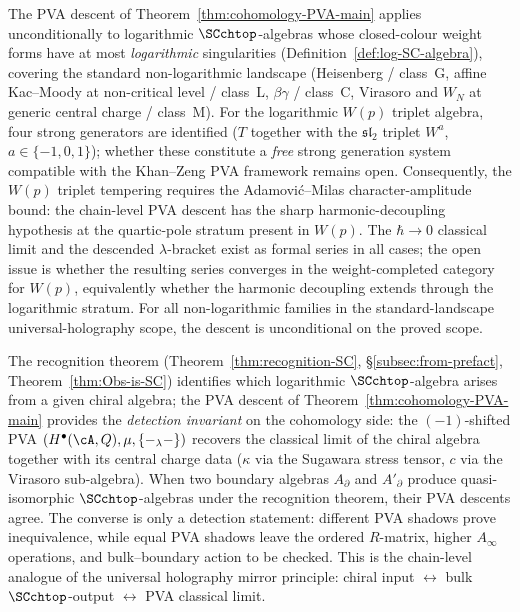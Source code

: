 \begin{remark}
\label{rem:pva-wp-tempering-scope}
The PVA descent of Theorem~\ref{thm:cohomology-PVA-main} applies
unconditionally to logarithmic $\SCchtop$-algebras whose closed-colour
weight forms have at most \emph{logarithmic} singularities
(Definition~\ref{def:log-SC-algebra}), covering the standard
non-logarithmic landscape (Heisenberg / class~G, affine Kac--Moody at
non-critical level / class~L, $\beta\gamma$ / class~C, Virasoro and
$W_N$ at generic central charge / class~M). For the logarithmic
$W(p)$ triplet algebra, four strong generators are identified ($T$
together with the $\mathfrak{sl}_2$ triplet $W^a$,
$a \in \{-1, 0, 1\}$); whether these constitute a \emph{free} strong
generation system compatible with the Khan--Zeng PVA framework
\cite{KZ25} remains open. Consequently, the $W(p)$ triplet tempering
requires the Adamovi\'c--Milas character-amplitude bound: the
chain-level PVA descent has the sharp harmonic-decoupling hypothesis
at the quartic-pole stratum present in $W(p)$. The $\hbar \to 0$
classical limit and the
descended $\lambda$-bracket exist as formal series in all cases; the
open issue is whether the resulting series converges in the
weight-completed category for $W(p)$, equivalently whether the
harmonic decoupling extends through the logarithmic stratum. For all
non-logarithmic families in the standard-landscape universal-holography
scope, the descent is unconditional on the proved scope.
\end{remark}

\begin{remark}
\label{rem:pva-recognition-detection}
The recognition theorem (Theorem~\ref{thm:recognition-SC}, \S\ref{subsec:from-prefact},
Theorem~\ref{thm:Obs-is-SC}) identifies which logarithmic $\SCchtop$-algebra
arises from a given chiral algebra; the PVA descent of
Theorem~\ref{thm:cohomology-PVA-main} provides the \emph{detection invariant}
on the cohomology side: the $(-1)$-shifted PVA $(H^\bullet(\cA,Q), \mu, \{-_\lambda-\})$
recovers the classical limit of the chiral algebra together with its central
charge data ($\kappa$ via the Sugawara stress tensor, $c$ via the Virasoro
sub-algebra). When two boundary algebras $A_\partial$ and $A'_\partial$ produce
quasi-isomorphic $\SCchtop$-algebras under the recognition theorem, their
PVA descents agree. The converse is only a detection statement:
different PVA shadows prove inequivalence, while equal PVA shadows
leave the ordered $R$-matrix, higher $A_\infty$ operations, and
bulk--boundary action to be checked. This is the chain-level analogue of the universal
holography mirror principle: chiral input $\leftrightarrow$ bulk
$\SCchtop$-output $\leftrightarrow$ PVA classical limit.
\end{remark}

